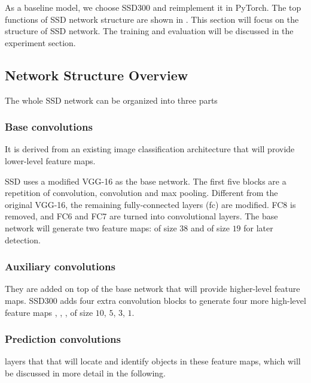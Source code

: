 \documentclass[journal,conference]{IEEEtran}
\begin{document}
As a baseline model, we choose SSD300 and reimplement it in PyTorch. The top functions of SSD network structure are shown in . This section will focus on the structure of SSD network. The training and evaluation will be discussed in the experiment section.


\subsection{Network Structure Overview}
The whole SSD network can be organized into three parts

\subsubsection{Base convolutions}
It is derived from an existing image classification architecture that will provide lower-level feature maps.

SSD uses a modified VGG-16 as the base network. The first five blocks are a repetition of convolution, convolution and max pooling. Different from the original VGG-16, the remaining fully-connected layers (fc) are modified. FC8 is removed, and FC6 and FC7 are turned into convolutional layers. The base network will generate two feature maps:  of size $38$ and  of size $19$ for later detection.

\subsubsection{Auxiliary convolutions}
They are added on top of the base network that will provide higher-level feature maps. SSD300 adds four extra convolution blocks to generate four more high-level feature maps , , ,  of size $10$, $5$, $3$, $1$.

\subsubsection{Prediction convolutions} layers that that will locate and identify objects in these feature maps, which will be discussed in more detail in the following.
\end{document}
